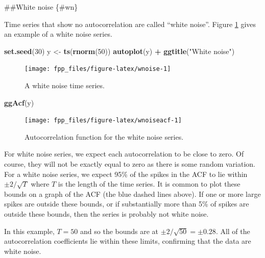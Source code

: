 \documentclass[]{book}
\newenvironment{Shaded}{\begin{snugshade}}{\end{snugshade}}
\newcommand{\DecValTok}[1]{\textcolor[rgb]{0.00,0.00,0.81}{#1}}
\newcommand{\KeywordTok}[1]{\textcolor[rgb]{0.13,0.29,0.53}{\textbf{#1}}}
\newcommand{\NormalTok}[1]{#1}
\newcommand{\OperatorTok}[1]{\textcolor[rgb]{0.81,0.36,0.00}{\textbf{#1}}}
\newcommand{\StringTok}[1]{\textcolor[rgb]{0.31,0.60,0.02}{#1}}
\begin{document}
\#\#White noise \{\#wn\}

Time series that show no autocorrelation are called ``white noise''. Figure \ref{fig:wnoise} gives an example of a white noise series.

\begin{Shaded}
\begin{Highlighting}[]
\KeywordTok{set.seed}\NormalTok{(}\DecValTok{30}\NormalTok{)}
\NormalTok{y <-}\StringTok{ }\KeywordTok{ts}\NormalTok{(}\KeywordTok{rnorm}\NormalTok{(}\DecValTok{50}\NormalTok{))}
\KeywordTok{autoplot}\NormalTok{(y) }\OperatorTok{+}\StringTok{ }\KeywordTok{ggtitle}\NormalTok{(}\StringTok{"White noise"}\NormalTok{)}
\end{Highlighting}
\end{Shaded}

\begin{figure}

{\centering \texttt{[image: fpp\_files/figure-latex/wnoise-1]} 

}

\caption{A white noise time series.}\label{fig:wnoise}
\end{figure}

\begin{Shaded}
\begin{Highlighting}[]
\KeywordTok{ggAcf}\NormalTok{(y)}
\end{Highlighting}
\end{Shaded}

\begin{figure}

{\centering \texttt{[image: fpp\_files/figure-latex/wnoiseacf-1]} 

}

\caption{Autocorrelation function for the white noise series.}\label{fig:wnoiseacf}
\end{figure}

For white noise series, we expect each autocorrelation to be close to zero. Of course, they will not be exactly equal to zero as there is some random variation. For a white noise series, we expect 95\% of the spikes in the ACF to lie within \(\pm 2/\sqrt{T}\) where \(T\) is the length of the time series. It is common to plot these bounds on a graph of the ACF (the blue dashed lines above). If one or more large spikes are outside these bounds, or if substantially more than 5\% of spikes are outside these bounds, then the series is probably not white noise.

In this example, \(T=50\) and so the bounds are at \(\pm 2/\sqrt{50} = \pm 0.28\). All of the autocorrelation coefficients lie within these limits, confirming that the data are white noise.
\end{document}
